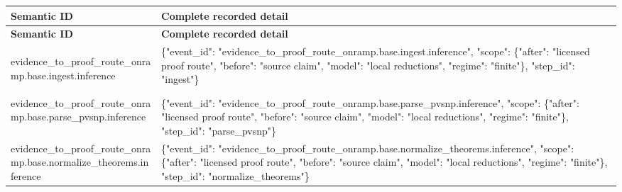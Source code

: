 \documentclass[10pt,a4paper]{article}
\begin{document}
\begin{longtable}{@{}>{\raggedright\arraybackslash}p{.20\linewidth}>{\raggedright\arraybackslash}p{.67\linewidth}@{}}
\toprule
\textbf{Semantic ID} & \textbf{Complete recorded detail}\\\midrule
\endfirsthead
\toprule
\textbf{Semantic ID} & \textbf{Complete recorded detail}\\\midrule
\endhead
\hypertarget{trace-scope-7c15376f63ac14e1ef}{evidence\_\allowbreak{}to\_\allowbreak{}proof\_\allowbreak{}route\_\allowbreak{}onramp.\allowbreak{}base.\allowbreak{}ingest.\allowbreak{}inference} & \{"event\_\allowbreak{}id":\allowbreak{} "evidence\_\allowbreak{}to\_\allowbreak{}proof\_\allowbreak{}route\_\allowbreak{}onramp.\allowbreak{}base.\allowbreak{}ingest.\allowbreak{}inference"\allowbreak{}, "scope":\allowbreak{} \{"after":\allowbreak{} "licensed proof route", "before":\allowbreak{} "source claim", "model":\allowbreak{} "local reductions\allowbreak{}", "regime":\allowbreak{} "finite"\},\allowbreak{} "step\_\allowbreak{}id":\allowbreak{} "ingest"\}\\
\hypertarget{trace-scope-5246884afec3a2384a}{evidence\_\allowbreak{}to\_\allowbreak{}proof\_\allowbreak{}route\_\allowbreak{}onramp.\allowbreak{}base.\allowbreak{}parse\_\allowbreak{}pvsnp.\allowbreak{}inference} & \{"event\_\allowbreak{}id":\allowbreak{} "evidence\_\allowbreak{}to\_\allowbreak{}proof\_\allowbreak{}route\_\allowbreak{}onramp.\allowbreak{}base.\allowbreak{}parse\_\allowbreak{}pvsnp.\allowbreak{}inference"\allowbreak{}, "scope":\allowbreak{} \{"after":\allowbreak{} "licensed proof route", "before":\allowbreak{} "source claim", "model":\allowbreak{} "local reductions\allowbreak{}", "regime":\allowbreak{} "finite"\},\allowbreak{} "step\_\allowbreak{}id":\allowbreak{} "parse\_\allowbreak{}pvsnp"\}\\
\hypertarget{trace-scope-ba9696a5ac34a21cbf}{evidence\_\allowbreak{}to\_\allowbreak{}proof\_\allowbreak{}route\_\allowbreak{}onramp.\allowbreak{}base.\allowbreak{}normalize\_\allowbreak{}theorems.\allowbreak{}inference} & \{"event\_\allowbreak{}id":\allowbreak{} "evidence\_\allowbreak{}to\_\allowbreak{}proof\_\allowbreak{}route\_\allowbreak{}onramp.\allowbreak{}base.\allowbreak{}normalize\_\allowbreak{}theorems.\allowbreak{}inference"\allowbreak{}, "scope":\allowbreak{} \{"after":\allowbreak{} "licensed proof route", "before":\allowbreak{} "source claim", "model":\allowbreak{} "local reductions\allowbreak{}", "regime":\allowbreak{} "finite"\},\allowbreak{} "step\_\allowbreak{}id":\allowbreak{} "normalize\allowbreak{}\_\allowbreak{}theorems"\}\allowbreak{}\\

\end{longtable}
\end{document}
